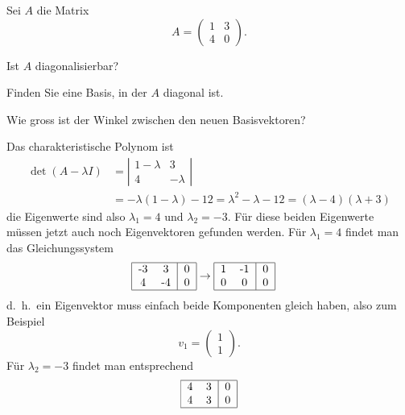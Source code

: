 Sei $A$ die Matrix
\[
A=\begin{pmatrix}
1&3\\
4&0
\end{pmatrix}.
\]
\begin{teilaufgaben}
\item Ist $A$ diagonalisierbar?
\item Finden Sie eine Basis, in der $A$ diagonal ist.
\item Wie gross ist der Winkel zwischen den neuen Basisvektoren?
\end{teilaufgaben}


\begin{loesung}
Das charakteristische Polynom ist
\begin{align*}
\det(A-\lambda I)
&=\left|\begin{matrix}
1-\lambda&3\\
4&-\lambda
\end{matrix}\right|
\\
&=-\lambda(1-\lambda)-12=\lambda^2-\lambda-12=(\lambda -4)(\lambda + 3)
\end{align*}
die Eigenwerte sind also $\lambda_1 = 4$ und $\lambda_2=-3$.
Für diese beiden Eigenwerte müssen jetzt auch noch Eigenvektoren
gefunden werden. Für $\lambda_1=4$ findet man das Gleichungssystem
\begin{align*}
\begin{tabular}{|cc|c|}
\hline
-3&3&0\\
4&-4&0\\
\hline
\end{tabular}
&\rightarrow
\begin{tabular}{|cc|c|}
\hline
1&-1&0\\
0&0&0\\
\hline
\end{tabular}
\end{align*}
d.~h.~ein Eigenvektor muss einfach beide Komponenten gleich haben, also
zum Beispiel
\[
v_1=\begin{pmatrix}1\\1\end{pmatrix}.
\]
Für $\lambda_2=-3$ findet man entsprechend
\begin{align*}
\begin{tabular}{|cc|c|}
\hline
4&3&0\\
4&3&0\\
\hline
\end{tabular}

\end{align*}
\end{loesung}
